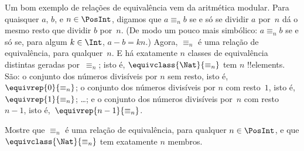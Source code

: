 \documentclass[../../../include/open-logic-section]{subfiles}
\begin{document}
\begin{ex}
Um bom exemplo de relações de equivalência vem da aritmética modular.
Para quaisquer $a$, $b$, e $n \in \PosInt$, digamos que $a \equiv_n b$ se e só se
dividir $a$ por~$n$ dá o mesmo resto que dividir $b$ por~$n$.
(De modo um pouco mais simbólico: $a \equiv_n b$ se e só se, para algum $k \in
\Int$, $a - b = kn$.) Agora, $\equiv_n$ é uma relação de equivalência, para
qualquer~$n$. E há exatamente $n$ classes de equivalência distintas
geradas por~$\equiv_n$; isto é, $\equivclass{\Nat}{\equiv_n}$ tem
$n$ !!{element}s. São: o conjunto dos números divisíveis por $n$
sem resto, isto é, $\equivrep{0}{\equiv_n}$; o conjunto dos números
divisíveis por $n$ com resto~$1$, isto é, $\equivrep{1}{\equiv_n}$;
\ldots; e o conjunto dos números divisíveis por~$n$ com resto~$n-1$,
isto é,~$\equivrep{n-1}{\equiv_n}$.
\end{ex}

\begin{prob}
Mostre que $\equiv_n$ é uma relação de equivalência, para qualquer $n \in
\PosInt$, e que $\equivclass{\Nat}{\equiv_n}$ tem exatamente $n$ membros.
\end{prob}
\end{document}
